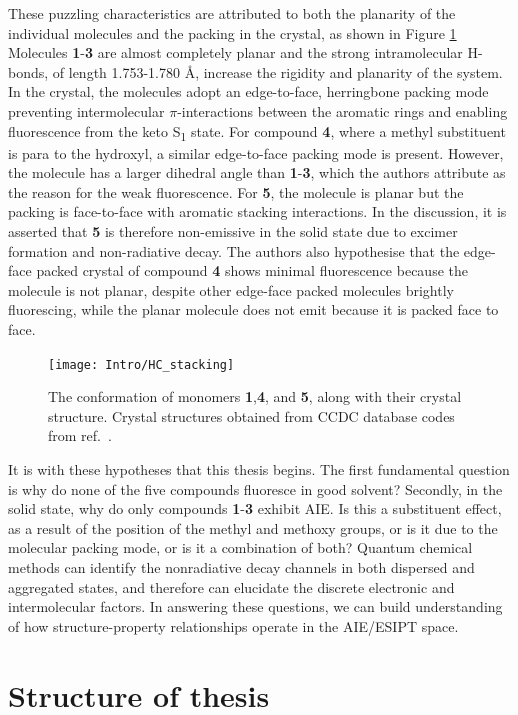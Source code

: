 These puzzling characteristics are attributed to both the planarity of the individual molecules and the packing in the crystal, as shown in Figure \ref{figure: HC_stacking}   Molecules \textbf{1}-\textbf{3} are almost completely planar and the strong intramolecular H-bonds, of length 1.753-1.780 \si{\angstrom}, increase the rigidity and planarity of the system. In the crystal, the molecules adopt an edge-to-face, herringbone packing mode preventing intermolecular $\pi$-interactions between the aromatic rings and enabling fluorescence from the keto S\textsubscript{1} state. For compound \textbf{4}, where a methyl substituent is para to the hydroxyl, a similar edge-to-face packing mode is present. However, the molecule has a larger dihedral angle than \textbf{1}-\textbf{3}, which the authors attribute as the reason for the weak fluorescence. For \textbf{5}, the molecule is planar but the packing is face-to-face with aromatic stacking interactions. In the discussion, it is asserted that \textbf{5} is therefore non-emissive in the solid state due to excimer formation and non-radiative decay. The authors also hypothesise that the edge-face packed crystal of compound \textbf{4} shows minimal fluorescence because the molecule is not planar, despite other edge-face packed molecules brightly fluorescing, while the planar molecule does not emit because it is packed face to face.
\begin{figure}[H]
\centering
  \texttt{[image: Intro/HC\_stacking]}
  \caption[Crystal structures of 2'-hydroxychalcone derivatives]{The conformation of monomers \textbf{1},\textbf{4}, and \textbf{5}, along with their crystal structure. Crystal structures obtained from CCDC database codes from ref.~.}
  \label{figure: HC_stacking}
\end{figure}
It is with these hypotheses that this thesis begins. The first fundamental question is why do none of the five compounds fluoresce in good solvent? Secondly, in the solid state, why do only compounds \textbf{1}-\textbf{3} exhibit AIE. Is this a substituent effect, as a result of the position of the methyl and methoxy groups, or is it due to the molecular packing mode, or is it a combination of both? Quantum chemical methods can identify the nonradiative decay channels in both dispersed and aggregated states, and therefore can elucidate the discrete electronic and intermolecular factors. In answering these questions, we can build understanding of how structure-property relationships operate in the AIE/ESIPT space. 
\section{Structure of thesis}\label{section: lom outline}



